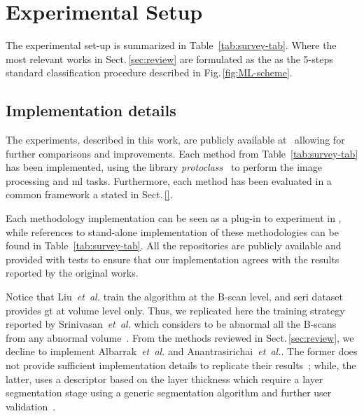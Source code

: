\graphicspath{ {./content/method/figures/} }

\section{Experimental Setup}\label{sec:exp}

The experimental set-up is summarized in Table~\ref{tab:survey-tab}.
Where the most relevant works in Sect.\,\ref{sec:review} are formulated as the as the 5-steps standard classification procedure described in Fig.\,\ref{fig:ML-scheme}.



\subsection{Implementation details}\label{sec:exp:implementation}
The experiments, described in this work, are publicly available at~\cite{rethinopaty20016apr-repoICPR} allowing for further comparisons and improvements.
Each method from Table~\ref{tab:survey-tab} has been implemented, using the library \emph{protoclass}~\cite{protoclass2016apr-repoICPR} to perform the image processing and \gls{ml} tasks.
Furthermore, each method has been evaluated in a common framework a stated in Sect.\,\ref{}.

{\color{red}Each methodology implementation can be seen as a plug-in to experiment in \cite{rethinopaty20016apr-repoICPR}, while references to stand-alone implementation of these methodologies can be found in Table~\ref{tab:survey-tab}.
All the repositories are publicly available and provided with tests to ensure that our implementation agrees with the results reported by the original works.}

Notice that Liu~\emph{et~al.} train the algorithm at the B-scan level, and \gls{seri} dataset provides \gls{gt} at volume level only.
Thus, we replicated here the training strategy reported by Srinivasan~\emph{et~al.} which considers to be abnormal all the B-scans from any abnormal volume~\cite{Srinivasan2014}.
From the methods reviewed in Sect.\,\ref{sec:review}, we decline to implement Albarrak~\emph{et~al.} and Anantrasirichai~\textit{et~al.}.
The former does not provide sufficient implementation details to replicate their results~\cite{albarrak2013age};
while, the latter, uses a descriptor based on the layer thickness which require a layer segmentation stage using a generic segmentation algorithm and further user validation~\cite{anantrasirichai2013svm}.


